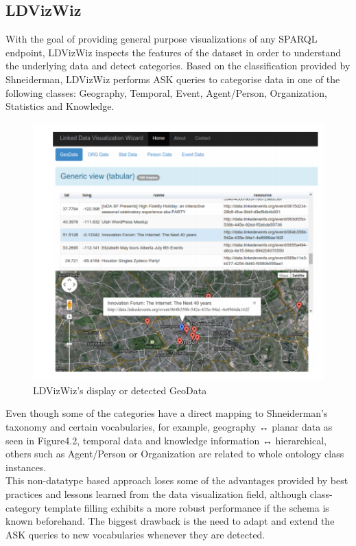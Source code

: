 \documentclass[a4paper,12pt,oneside]{report}
\begin{document}
{{{{\subsection{LDVizWiz}
{With the goal of providing general purpose visualizations of any SPARQL endpoint, LDVizWiz  inspects the features of the dataset in order to understand the underlying data and detect categories.
Based on the classification provided by Shneiderman, LDVizWiz performs ASK queries to categorise data in one of the following classes: Geography, Temporal, Event, Agent/Person, Organization, Statistics and Knowledge.
\begin{figure}[h!]
\centering
\includegraphics[width=1\textwidth]{Capture10}
\caption{LDVizWiz’s display or detected GeoData}
\end{figure}
Even though some of the categories have a direct mapping to Shneiderman’s taxonomy and certain vocabularies, for example, geography ↔ planar data as seen in Figure4.2, temporal data and knowledge information ↔ hierarchical, others such as Agent/Person
or Organization are related to whole ontology class instances.\\
 This non-datatype based approach loses some of the advantages provided by best practices and lessons learned from the data visualization field, although class-category template filling exhibits a more
robust performance if the schema is known beforehand. The biggest drawback is the need to adapt and extend the ASK queries to new vocabularies whenever they are detected.}
}}}}
\end{document}
